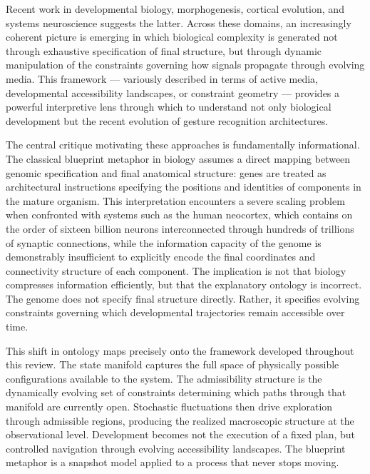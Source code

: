 \documentclass[11pt, a4paper]{article}
\theoremstyle{definition}
\begin{document}
Recent work in developmental biology, morphogenesis, cortical evolution, and systems neuroscience suggests the latter. Across these domains, an increasingly coherent picture is emerging in which biological complexity is generated not through exhaustive specification of final structure, but through dynamic manipulation of the constraints governing how signals propagate through evolving media. This framework --- variously described in terms of active media, developmental accessibility landscapes, or constraint geometry --- provides a powerful interpretive lens through which to understand not only biological development but the recent evolution of gesture recognition architectures.

The central critique motivating these approaches is fundamentally informational. The classical blueprint metaphor in biology assumes a direct mapping between genomic specification and final anatomical structure: genes are treated as architectural instructions specifying the positions and identities of components in the mature organism. This interpretation encounters a severe scaling problem when confronted with systems such as the human neocortex, which contains on the order of sixteen billion neurons interconnected through hundreds of trillions of synaptic connections, while the information capacity of the genome is demonstrably insufficient to explicitly encode the final coordinates and connectivity structure of each component. The implication is not that biology compresses information efficiently, but that the explanatory ontology is incorrect. The genome does not specify final structure directly. Rather, it specifies evolving constraints governing which developmental trajectories remain accessible over time.

This shift in ontology maps precisely onto the framework developed throughout this review. The state manifold captures the full space of physically possible configurations available to the system. The admissibility structure is the dynamically evolving set of constraints determining which paths through that manifold are currently open. Stochastic fluctuations then drive exploration through admissible regions, producing the realized macroscopic structure at the observational level. Development becomes not the execution of a fixed plan, but controlled navigation through evolving accessibility landscapes. The blueprint metaphor is a snapshot model applied to a process that never stops moving.
\end{document}
